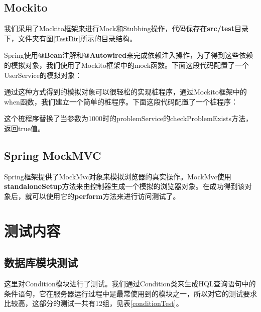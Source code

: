 \subsection{Mockito}
我们采用了Mockito框架来进行Mock和Stubbing操作，代码保存在\textbf{src/test}目录下，文件夹有图\ref{TestDir}所示的目录结构。


Spring使用\textbf{@Bean}注解和\textbf{@Autowired}来完成依赖注入操作，为了得到这些依赖的模拟对象，我们使用了Mockito框架中的mock函数。下面这段代码配置了一个UserService的模拟对象：



通过这种方式得到的模拟对象可以很轻松的实现桩程序，通过Mockito框架中的when函数，我们建立一个简单的桩程序。下面这段代码配置了一个桩程序：



这个桩程序替换了当参数为1000时的problemService的checkProblemExists方法，返回true值。

\subsection{Spring MockMVC}
Spring框架提供了MockMvc对象来模拟浏览器的真实操作。MockMvc使用\textbf{standaloneSetup}方法来由控制器生成一个模拟的浏览器对象。在成功得到该对象后，就可以使用它的\textbf{perform}方法来进行访问测试了。



\section{测试内容}
\subsection{数据库模块测试}
这里对Condition模块进行了测试。我们通过Condition类来生成HQL查询语句中的条件语句，它在服务器运行过程中是最常使用到的模块之一，所以对它的测试要求比较高，这部分的测试一共有12组，见表\ref{conditionTest}。

